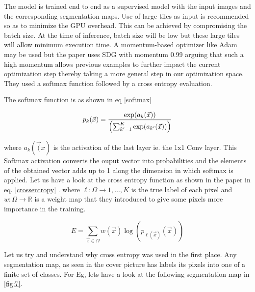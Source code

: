 \documentclass[19pt]{article}
\begin{document}
The model is trained end to end as a supervised model with the input images and the corresponding segmentation maps. Use of large tiles as input is recommended so as to minimize the GPU overhead. This can be achieved by compromising the batch size. At the time of inference, batch size will be low but these large tiles will allow minimum execution time. A momentum-based optimizer like Adam may be used but the paper uses SDG with momentum 0.99 arguing that such a high momentum allows previous examples to further impact the current optimization step thereby taking a more general step in our optimization space. They used a softmax function followed by a cross entropy evaluation. 

The softmax function is as shown in eq \ref{softmax}

\begin{equation}
    \label{softmax}
        {p}_k(\vec{x}) = {\exp({a_k(\vec{x})}) \over \left(\sum_{k' =     1}^K \exp(a_{k'}(\vec{x}))\right)}
\end{equation}

where $a_k(\vec(x)$ is the activation of the last layer ie. the 1x1 Conv layer. This Softmax activation converts the ouput vector into probabilities and the elements of the obtained vector adds up to 1 along the dimension in which softmax is applied. Let us have a look at the cross entropy function as shown in the paper in eq. \ref{crossentropy} .
where $ \ell:\Omega \rightarrow {1,\dots,K} $ is the true label of each pixel and $ w:\Omega \rightarrow \mathbb{R} $  is a weight map that they introduced to give some pixels more importance in the training.

\begin{equation} 
    \label{crossentropy} 
        E = \sum_{\vec{x} \in \Omega} w(\vec{x}) \log({p}_{\ell(\vec{x})}(\vec{x}))  
\end{equation}

Let us try and understand why cross entropy was used in the first place. Any segmentation map, as seen in the cover picture has labels its pixels into one of a finite set of classes. For Eg, lets have a look at the following segmentation map in \ref{fig:7}.
\end{document}
